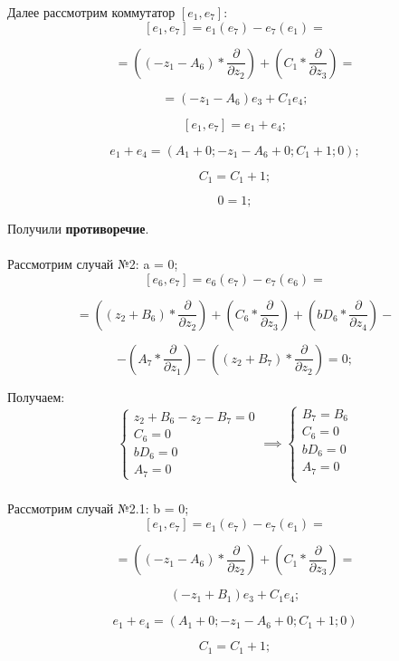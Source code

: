 \documentclass[12pt]{article}
\begin{document}
Далее рассмотрим коммутатор $[e_1, e_7]$: 
\[
[e_1, e_7] = e_1(e_7) - e_7(e_1) = 
\]

\[
= \left((-z_1 - A_6) * \frac{\partial}{\partial z_2}\right)
+ \left(C_1 * \frac{\partial}{\partial z_3}\right) =
\]

\[
= (-z_1 - A_6)e_3 + C_1e_4;
\]

\[
[e_1, e_7] = e_1 + e_4;
\]

\[
e_1 + e_4 = \left(A_1 + 0; -z_1 - A_6 + 0; C_1 + 1; 0 \right);
\]

\[
C_1 = C_1 + 1;
\]

\[
0 = 1;
\]

Получили \textbf{противоречие}.\\\\
Рассмотрим случай №2: a = 0;
\[
[e_6, e_7] = e_6(e_7) - e_7(e_6) = 
\]

\[
= \left( (z_2 + B_6) * \frac{\partial}{\partial z_2} \right)
+ \left( C_6 * \frac{\partial}{\partial z_3} \right)
+ \left( bD_6 * \frac{\partial}{\partial z_4} \right) - 
\]

\[
- \left( A_7 * \frac{\partial}{\partial z_1} \right)
- \left( (z_2 + B_7) * \frac{\partial}{\partial z_2} \right) = 0;
\]

Получаем: \\
\[
\begin{cases}
z_2 + B_6 - z_2 - B_7 = 0 \\
C_6 = 0 \\
bD_6 = 0 \\
A_7 = 0
\end{cases}
\implies
\begin{cases}
B_7 = B_6 \\
C_6 = 0 \\
bD_6 = 0 \\
A_7 = 0 \\
\end{cases}
\]\\


Рассмотрим случай №2.1: b = 0; \\

\[
[e_1, e_7] = e_1(e_7) - e_7(e_1) = 
\]

\[
= \left( (-z_1 - A_6) * \frac{\partial}{\partial z_2} \right)
+ \left( C_1 * \frac{\partial}{\partial z_3} \right) =
\]

\[
(-z_1 + B_1)e_3 + C_1e_4;
\]

\[
e_1 + e_4 = \left(A_1 + 0; -z_1 - A_6 + 0; C_1 + 1; 0 \right)
\]

\[
C_1 = C_1 + 1;
\]
\end{document}
